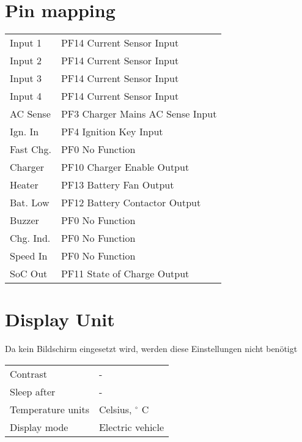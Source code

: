 \section*{Pin mapping}
\begin{tabular}{p{4cm}p{11cm}}
	Input 1 & PF14 Current Sensor Input \\
	Input 2 & PF14 Current Sensor Input \\
	Input 3 & PF14 Current Sensor Input \\
	Input 4 & PF14 Current Sensor Input \\
	AC Sense & PF3 Charger Mains AC Sense Input \\
	Ign. In & PF4 Ignition Key Input \\
	Fast Chg. & PF0 No Function \\
	Charger & PF10 Charger Enable Output \\
	Heater & PF13 Battery Fan Output \\
	Bat. Low & PF12 Battery Contactor Output \\
	Buzzer & PF0 No Function \\
	Chg. Ind. & PF0 No Function \\
	Speed In & PF0 No Function \\
	SoC Out & PF11 State of Charge Output
\end{tabular}

\section*{Display Unit}
Da kein Bildschirm eingesetzt wird, werden diese Einstellungen nicht benötigt \\
\begin{tabular}{p{11cm}p{4cm}}
	Contrast & - \\
	Sleep after & - \\
	Temperature units & Celsius, $^\circ$ C \\
	Display mode & Electric vehicle
\end{tabular}
\newpage

